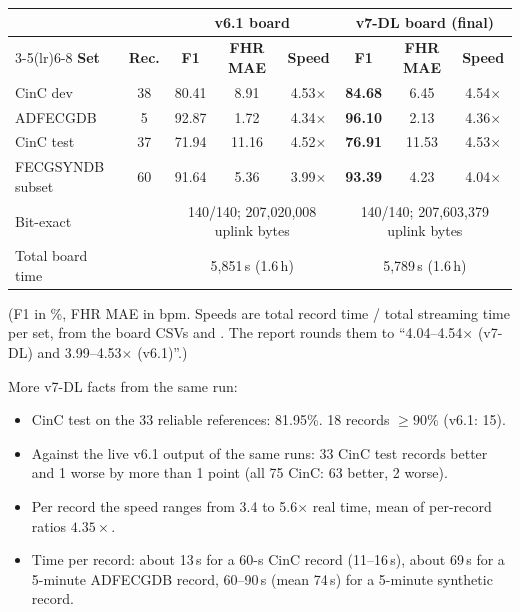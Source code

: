 \documentclass[11pt]{article}
\begin{document}
\begin{center}
\small
\begin{tabular}{@{}lccccccc@{}}
\toprule
 & & \multicolumn{3}{c}{\textbf{v6.1 board}} & \multicolumn{3}{c}{\textbf{v7-DL board (final)}} \\
\cmidrule(lr){3-5}\cmidrule(lr){6-8}
\textbf{Set} & \textbf{Rec.} & \textbf{F1} & \textbf{FHR MAE} & \textbf{Speed} & \textbf{F1} & \textbf{FHR MAE} & \textbf{Speed} \\
\midrule
CinC dev & 38 & 80.41 & 8.91 & 4.53$\times$ & \textbf{84.68} & 6.45 & 4.54$\times$ \\
ADFECGDB & 5 & 92.87 & 1.72 & 4.34$\times$ & \textbf{96.10} & 2.13 & 4.36$\times$ \\
CinC test & 37 & 71.94 & 11.16 & 4.52$\times$ & \textbf{76.91} & 11.53 & 4.53$\times$ \\
FECGSYNDB subset & 60 & 91.64 & 5.36 & 3.99$\times$ & \textbf{93.39} & 4.23 & 4.04$\times$ \\
\midrule
Bit-exact & & \multicolumn{3}{c}{140/140; 207,020,008 uplink bytes} & \multicolumn{3}{c}{140/140; 207,603,379 uplink bytes} \\
Total board time & & \multicolumn{3}{c}{5,851\,s (1.6\,h)} & \multicolumn{3}{c}{5,789\,s (1.6\,h)} \\
\bottomrule
\end{tabular}
\end{center}
(F1 in \%, FHR MAE in bpm. Speeds are total record time / total streaming time per set, from the board CSVs  and . The report rounds them to ``4.04--4.54$\times$ (v7-DL) and 3.99--4.53$\times$ (v6.1)''.)

More v7-DL facts from the same run:
\begin{itemize}
  \item CinC test on the 33 reliable references: 81.95\%. 18 records $\ge 90\%$ (v6.1: 15).
  \item Against the live v6.1 output of the same runs: 33 CinC test records better and 1 worse by more than 1 point (all 75 CinC: 63 better, 2 worse).
  \item Per record the speed ranges from 3.4 to 5.6$\times$ real time, mean of per-record ratios $4.35\times$.
  \item Time per record: about 13\,s for a 60-s CinC record (11--16\,s), about 69\,s for a 5-minute ADFECGDB record, 60--90\,s (mean 74\,s) for a 5-minute synthetic record.
\end{itemize}
\end{document}
